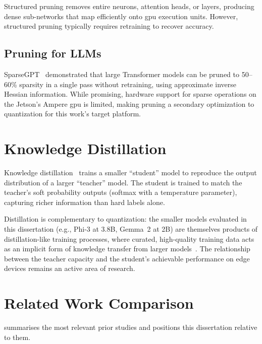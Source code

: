 \documentclass[12pt,a4paper,oneside]{report}
\begin{document}
Structured pruning removes entire neurons, attention heads, or layers, producing dense sub-networks that map efficiently onto \gls{gpu} execution units. However, structured pruning typically requires retraining to recover accuracy.

\subsection{Pruning for LLMs}

SparseGPT~\cite{frantar2023sparsegpt} demonstrated that large Transformer models can be pruned to 50--60\% sparsity in a single pass without retraining, using approximate inverse Hessian information. While promising, hardware support for sparse operations on the Jetson's Ampere \gls{gpu} is limited, making pruning a secondary optimization to quantization for this work's target platform.


\section{Knowledge Distillation}
\label{sec:sota-distillation}

Knowledge distillation~\cite{hinton2015distilling} trains a smaller ``student'' model to reproduce the output distribution of a larger ``teacher'' model. The student is trained to match the teacher's soft probability outputs (softmax with a temperature parameter), capturing richer information than hard labels alone.

Distillation is complementary to quantization: the smaller models evaluated in this dissertation (e.g., Phi-3 at 3.8B, Gemma~2 at 2B) are themselves products of distillation-like training processes, where curated, high-quality training data acts as an implicit form of knowledge transfer from larger models~\cite{gou2021knowledge}. The relationship between the teacher capacity and the student's achievable performance on edge devices remains an active area of research.


\section{Related Work Comparison}
\label{sec:sota-related}

 summarises the most relevant prior studies and positions this dissertation relative to them.
\end{document}
